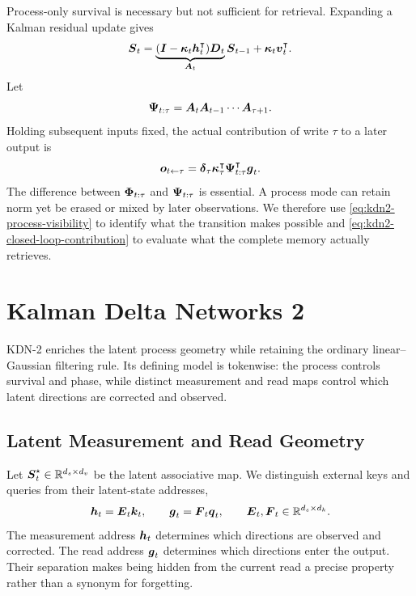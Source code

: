 \documentclass[11pt,letterpaper,logo]{yalearxiv}
\begin{document}
Process-only survival is necessary but not sufficient for retrieval. Expanding a Kalman residual
update gives
\begin{equation}
  \boldsymbol{S}_t
  =
  \underbrace{
    (\boldsymbol{I}-\boldsymbol{\kappa}_t\boldsymbol{h}_t^{\intercal})\boldsymbol{D}_t
  }_{\boldsymbol{A}_t}
  \boldsymbol{S}_{t-1}
  +
  \boldsymbol{\kappa}_t\boldsymbol{v}_t^{\intercal}.
  \label{eq:kdn2-closed-loop-carry}
\end{equation}
Let
\begin{equation}
  \boldsymbol{\Psi}_{t:\tau}
  =
  \boldsymbol{A}_t\boldsymbol{A}_{t-1}\cdots\boldsymbol{A}_{\tau+1}.
  \label{eq:kdn2-closed-loop-product}
\end{equation}
Holding subsequent inputs fixed, the actual contribution of write $\tau$ to a later output is
\begin{equation}
  \boldsymbol{o}_{t\leftarrow\tau}
  =
  \boldsymbol{\delta}_\tau
  \boldsymbol{\kappa}_\tau^{\intercal}
  \boldsymbol{\Psi}_{t:\tau}^{\intercal}\boldsymbol{g}_t.
  \label{eq:kdn2-closed-loop-contribution}
\end{equation}
The difference between $\boldsymbol{\Phi}_{t:\tau}$ and $\boldsymbol{\Psi}_{t:\tau}$ is essential. A process mode
can retain norm yet be erased or mixed by later observations. We therefore use
\eqref{eq:kdn2-process-visibility} to identify what the transition makes possible and
\eqref{eq:kdn2-closed-loop-contribution} to evaluate what the complete memory actually retrieves.


\section{Kalman Delta Networks 2}
\label{sec:kdn2-method}

KDN-2 enriches the latent process geometry while retaining the ordinary linear--Gaussian
filtering rule. Its defining model is tokenwise: the process controls survival and phase, while
distinct measurement and read maps control which latent directions are corrected and observed.

\subsection{Latent Measurement and Read Geometry}
\label{sec:kdn2-address-geometry}

Let $\boldsymbol{S}_t^\star\in\mathbb{R}^{d_s\times d_v}$ be the latent associative map. We distinguish external
keys and queries from their latent-state addresses,
\begin{equation}
  \boldsymbol{h}_t=\boldsymbol{E}_t\boldsymbol{k}_t,
  \qquad
  \boldsymbol{g}_t=\boldsymbol{F}_t\boldsymbol{q}_t,
  \qquad
  \boldsymbol{E}_t,\boldsymbol{F}_t\in\mathbb{R}^{d_s\times d_k}.
  \label{eq:kdn2-address-lifts}
\end{equation}
The measurement address $\boldsymbol{h}_t$ determines which directions are observed and corrected. The
read address $\boldsymbol{g}_t$ determines which directions enter the output. Their separation makes
being hidden from the current read a precise property rather than a synonym for forgetting.
\end{document}
